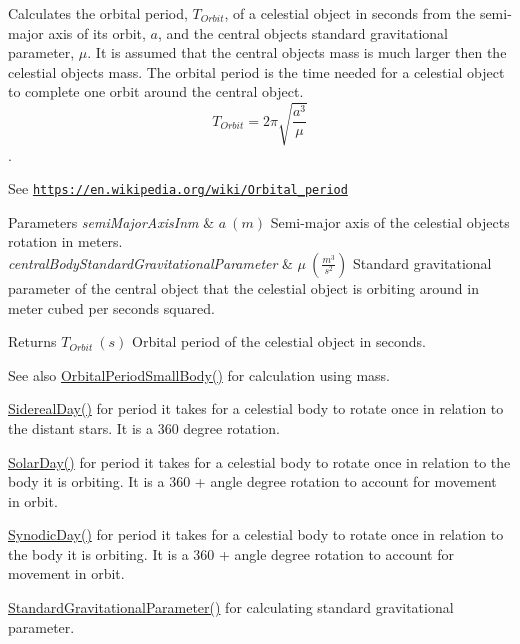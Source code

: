 Calculates the orbital period, $T_{Orbit}$, of a celestial object in seconds from the semi-\/major axis of its orbit, $a$, and the central object\textquotesingle{}s standard gravitational parameter, $\mu$. It is assumed that the central object\textquotesingle{}s mass is much larger then the celestial objects mass. The orbital period is the time needed for a celestial object to complete one orbit around the central object. \[ T_{Orbit}=2\pi\sqrt{\dfrac{a^3}{\mu}}\]. 

See \href{https://en.wikipedia.org/wiki/Orbital_period}{\tt https\+://en.\+wikipedia.\+org/wiki/\+Orbital\+\_\+period}


\begin{DoxyParams}{Parameters}
{\em semi\+Major\+Axis\+Inm} & $ a\ (m)$ Semi-\/major axis of the celestial object\textquotesingle{}s rotation in meters. \\
\hline
{\em central\+Body\+Standard\+Gravitational\+Parameter} & $ \mu\ (\frac{m^3}{s^2})$ Standard gravitational parameter of the central object that the celestial object is orbiting around in meter cubed per seconds squared. \\
\hline
\end{DoxyParams}
\begin{DoxyReturn}{Returns}
$ T_{Orbit}\ (s)$ Orbital period of the celestial object in seconds. 
\end{DoxyReturn}
\begin{DoxySeeAlso}{See also}
\mbox{\hyperlink{group___e_g_x_phys-_astrophysic-_orbital_period_ga5d4cc706d875fd82a83e566ade16546d}{Orbital\+Period\+Small\+Body()}} for calculation using mass. 

\mbox{\hyperlink{group___e_g_x_phys-_astrophysic-_sidereal_day_ga587900d5fc755228c1bb5121cd7965c6}{Sidereal\+Day()}} for period it takes for a celestial body to rotate once in relation to the distant stars. It is a 360 degree rotation. 

\mbox{\hyperlink{group___e_g_x_phys-_astrophysic-_solar_day_gae321e0dd0c031a57c45b15dc819635e0}{Solar\+Day()}} for period it takes for a celestial body to rotate once in relation to the body it is orbiting. It is a 360 + angle degree rotation to account for movement in orbit. 

\mbox{\hyperlink{group___e_g_x_phys-_astrophysic-_synodic_day_ga637140842bc008c87d90e65b551cbac7}{Synodic\+Day()}} for period it takes for a celestial body to rotate once in relation to the body it is orbiting. It is a 360 + angle degree rotation to account for movement in orbit. 

\mbox{\hyperlink{group___e_g_x_phys-_astrophysics-_standard_gravitational_parameter_ga37f4ed78b0fc23603b49ade3e435ea20}{Standard\+Gravitational\+Parameter()}} for calculating standard gravitational parameter. 
\end{DoxySeeAlso}
\mbox{\label{group___e_g_x_phys-_astrophysic-_orbital_period_ga60d2541fdf2108542e52879ae907d81c}} 
